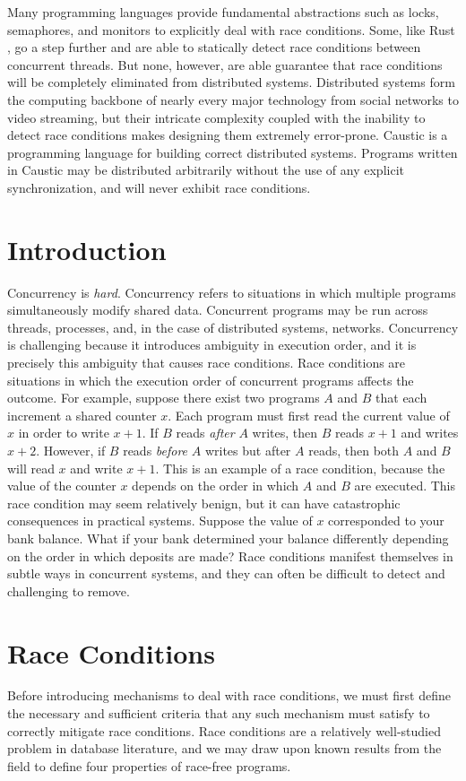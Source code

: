 \documentclass[../main.tex]{subfiles}
\begin{document}
Many programming languages provide fundamental abstractions such as locks, semaphores, and monitors
to explicitly deal with race conditions. Some, like Rust \cite{rust}, go a step further and are able
to statically detect race conditions between concurrent threads. But none, however, are able
guarantee that race conditions will be completely eliminated from distributed systems. Distributed
systems form the computing backbone of nearly every major technology from social networks to video
streaming, but their intricate complexity coupled with the inability to detect race conditions makes
designing them extremely error-prone. Caustic is a programming language for building correct
distributed systems. Programs written in Caustic may be distributed arbitrarily without the use of
any explicit synchronization, and will never exhibit race conditions.

\section{Introduction}
Concurrency is \emph{hard}. Concurrency refers to situations in which multiple programs
simultaneously modify shared data. Concurrent programs may be run across threads, processes,
and, in the case of distributed systems, networks. Concurrency is challenging because it introduces
ambiguity in execution order, and it is precisely this ambiguity that causes race conditions. Race
conditions are situations in which the execution order of concurrent programs affects the outcome.
For example, suppose there exist two programs $A$ and $B$ that each increment a shared counter $x$.
Each program must first read the current value of $x$ in order to write $x + 1$. If $B$ reads
\emph{after} $A$ writes, then $B$ reads $x + 1$ and writes $x + 2$. However, if $B$ reads
\emph{before} $A$ writes but after $A$ reads, then both $A$ and $B$ will read $x$ and write $x + 1$.
This is an example of a race condition, because the value of the counter $x$ depends on the order in
which $A$ and $B$ are executed. This race condition may seem relatively benign, but it can have
catastrophic consequences in practical systems. Suppose the value of $x$ corresponded to your bank
balance. What if your bank determined your balance differently depending on the order in which
deposits are made? Race conditions manifest themselves in subtle ways in concurrent systems, and
they can often be difficult to detect and challenging to remove.

\section{Race Conditions}
Before introducing mechanisms to deal with race conditions, we must first define the necessary and
sufficient criteria that any such mechanism must satisfy to correctly mitigate race conditions.
Race conditions are a relatively well-studied problem in database literature, and we may draw upon
known results from the field to define four properties of race-free programs. \cite{transactions}
\end{document}
